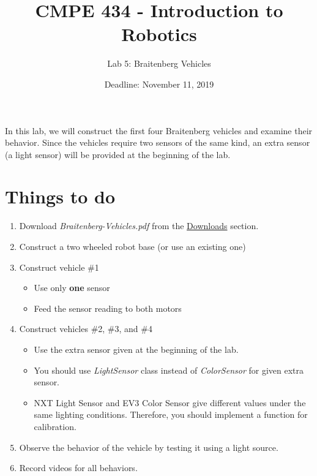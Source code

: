 \documentclass{scrartcl}
\title{CMPE 434 - Introduction to Robotics}
\subtitle{Lab 5: Braitenberg Vehicles}
\date{Deadline: November 11, 2019}
\begin{document}
\maketitle

In this lab, we will construct the first four Braitenberg vehicles and examine their behavior. Since the vehicles require two sensors of the same kind, an extra sensor (a light sensor) will be provided at the beginning of the lab.

\section{Things to do}

\begin{enumerate}
    \def\labelenumi{\arabic{enumi}.}
    \item Download \textit{Braitenberg-Vehicles.pdf} from the \href{http://robot.cmpe.boun.edu.tr/~cmpe434/doku.php?id=downloads#control}{Downloads} section.
    \item Construct a two wheeled robot base (or use an existing one)
    \item Construct vehicle \#1

    \begin{itemize} 
        \item Use only \textbf{one} sensor
        \item Feed the sensor reading to both motors
    \end{itemize}

    \def\labelenumi{\arabic{enumi}.}
    \item Construct vehicles \#2, \#3, and \#4
    \begin{itemize}
        \item Use the extra sensor given at the beginning of the lab.
        \item You should use \textit{LightSensor} class instead of \textit{ColorSensor} for given extra sensor.
        \item  NXT Light Sensor and EV3 Color Sensor give different values under the same lighting conditions. Therefore, you should implement a function for calibration.
    \end{itemize}

    \def\labelenumi{\arabic{enumi}.}
    \item Observe the behavior of the vehicle by testing it using a light source.
    \item Record videos for all behaviors.
\end{enumerate}
\end{document}
